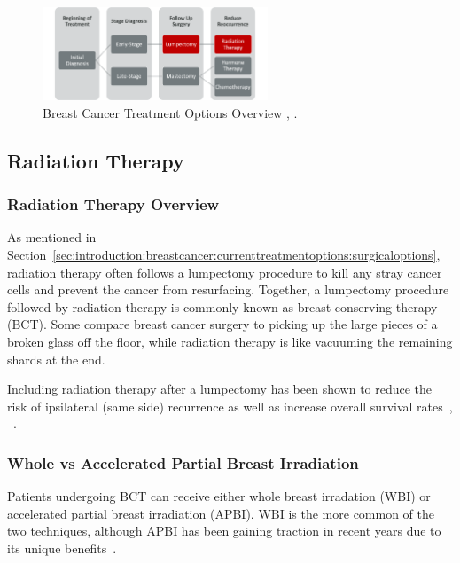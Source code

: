 \begin{figure}[h!]
        \centering
        \includegraphics[width=0.6\textwidth]{../figs/introduction/breast_cancer_treatment_process_flowchart.png}
        \caption{Breast Cancer Treatment Options Overview \cite{RefWorks:RefID:37-memorialsurgery}, \cite{RefWorks:RefID:370-einsteinisaac}.}
        \label{fig:introduction:breast_cancer_treatment_options_overview}
\end{figure}

\subsection{Radiation Therapy\label{sec:introduction:radiationtherapy}}
\subsubsection{Radiation Therapy Overview\label{sec:introduction:radiationtherapy:overview}}
As mentioned in Section~\ref{sec:introduction:breastcancer:currenttreatmentoptions:surgicaloptions}, radiation therapy often follows a lumpectomy procedure to kill any stray cancer cells and prevent the cancer from resurfacing. Together, a lumpectomy procedure followed by radiation therapy is commonly known as breast-conserving therapy (BCT). Some compare breast cancer surgery to picking up the large pieces of a broken glass off the floor, while radiation therapy is like vacuuming the remaining shards at the end.

Including radiation therapy after a lumpectomy has been shown to reduce the risk of ipsilateral (same side) recurrence as well as increase overall survival rates~\cite{RefWorks:RefID:157-thomasscience}, ~\cite{RefWorks:RefID:198-jiao2024interobserver}.

\subsubsection{Whole vs Accelerated Partial Breast Irradiation\label{sec:introduction:radiationtherapy:wholevsacceleratedpartialbreastirradiation}}
Patients undergoing BCT can receive either whole breast irradation (WBI) or accelerated partial breast irradiation (APBI). WBI is the more common of the two techniques, although APBI has been gaining traction in recent years due to its unique benefits~\cite{RefWorks:RefID:157-thomasscience}.

